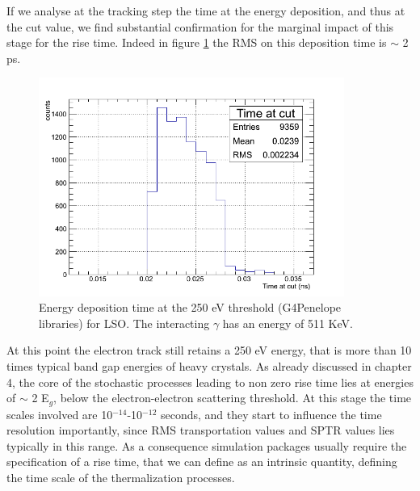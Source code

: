 If we analyse at the tracking step the time at the energy deposition, and thus at the cut value, we find substantial confirmation for the marginal impact of this stage for the rise time. Indeed in figure \ref{fig:energy_dep_time} the RMS on this deposition time is $\sim$ 2 ps.
\begin{figure}[htbp]
\begin{center}
\includegraphics[width=10cm]{../Pictures/Chapter_6/time_und_thr.png}
\end{center}
\caption[Time of deposition at 250 eV]{Energy deposition time at the 250 eV threshold (G4Penelope libraries) for LSO. The interacting $\gamma$ has an energy of 511 KeV.}
\label{fig:energy_dep_time}
\end{figure}

At this point the electron track still retains a 250 eV energy, that is more than 10 times typical band gap energies of heavy crystals. 
As already discussed in chapter 4, the core of the stochastic processes leading to non zero rise time lies at energies of $\sim$ 2 E$_{g}$, below the electron-electron scattering threshold. At this stage the time scales involved are 10$^{-14}$-10$^{-12}$ seconds, and they start to influence the time resolution importantly, since RMS transportation values and SPTR values lies typically in this range.
As a consequence simulation packages usually require the specification of a rise time, that we can define as an intrinsic quantity, defining the time scale of the thermalization processes.

